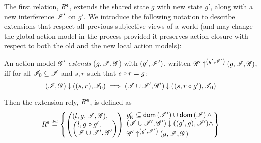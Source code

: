 The first relation, $R^{\textsf{e}}$, extends the shared state $g$ with new
state $g'$, along with a new interference $\mathscr{I}'$ on $g'$. We introduce
the following notation to describe extensions that respect all
previous subjective views of a world (and may change the global action
model in the process provided it preserves action closure with respect
to both the old and the new local action models):
\begin{definition}\label{def:amodExtension}
An action model $\mathscr{G}'$ \emph{extends} ($g, \mathscr{I}, \mathscr{G}$) with
$(g', \mathscr{I}')$, written
$\mathscr{G}' \mathbin{\uparrow}^{\left(g', \mathscr{I}'\right)} (g, \mathscr{I}, \mathscr{G})$, iff for all
$\mathscr{I}_0 \subseteq \mathscr{I}$ and $s, r$ such that $s \circ r = g$:
\[
(\mathscr{I}, \mathscr{G}) \mathbin{\downarrow} ((s, r), \mathscr{I}_0) \implies (\mathscr{I} \cup \mathscr{I}', \mathscr{G}') \mathbin{\downarrow} ((s, r\circ g'), \mathscr{I}_0)
\]
\end{definition}
Then the extension rely, $R^{\textsf{e}}$, is defined as
\vspace{-1ex}
\[
  \extendR \eqdef
  \left\{
  \begin{array}{@{} l @{\hspace*{2pt}} | @{\hspace*{2pt}} r @{}}
    \left(
    \begin{array}{@{} l @{}}
      (l , g, \lmod, \gmod),\\
      \left(
      \begin{array}{@{} l @{}}
	l,
	g \composeL g',\\
	\lmod \cup \lmod', \gmod'
      \end{array}
      \right)
    \end{array}
    \right)
    &
    \begin{array}{@{} l @{}}
      \capPart{g'} \subseteq \dom{\lmod'} \cup \dom{\lmod} \land \\
      \extendsAM{\lmod \cup \lmod', \gmod'}{g'}{g}{\lmod'} \land \\
      \expandsAM{\gmod'}{g'}{\lmod'}{g}{\lmod}{\gmod}
    \end{array}
  \end{array}
  \right\}
\]


